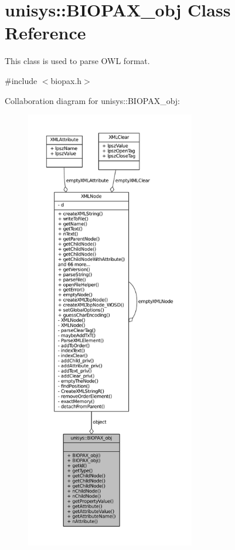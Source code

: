 \hypertarget{classunisys_1_1BIOPAX__obj}{\section{unisys\-:\-:B\-I\-O\-P\-A\-X\-\_\-obj Class Reference}
\label{classunisys_1_1BIOPAX__obj}
}


This class is used to parse O\-W\-L format.  




{\ttfamily \#include $<$biopax.\-h$>$}



Collaboration diagram for unisys\-:\-:B\-I\-O\-P\-A\-X\-\_\-obj\-:
\nopagebreak
\begin{figure}[H]
\begin{center}
\leavevmode
\includegraphics[height=550pt]{classunisys_1_1BIOPAX__obj__coll__graph}
\end{center}
\end{figure}
